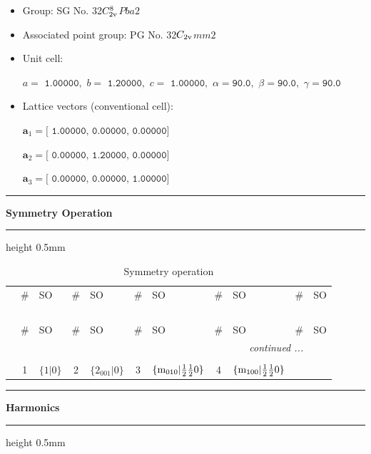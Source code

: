 \documentclass[fleqn,10pt,landscape]{jsarticle}
\begin{document}
\begin{itemize}
\item Group: SG No. 32\quad$C_{\rm 2v}^{8}$\quad$Pba2$\quad[ orthorhombic ]
\item Associated point group: PG No. 32\quad$C_{\rm 2v}$\quad$mm2$\quad[ orthorhombic ]
\end{itemize}
\begin{itemize}
\item Unit cell:

\quad $a=\texttt{ 1.00000},\,\, b=\texttt{ 1.20000},\,\, c=\texttt{ 1.00000},\,\, \alpha=\texttt{90.0},\,\, \beta=\texttt{90.0},\,\, \gamma=\texttt{90.0}$

\item Lattice vectors (conventional cell):

\quad $\bm{a}_1=\texttt{[ 1.00000, 0.00000, 0.00000]}$

\quad $\bm{a}_2=\texttt{[ 0.00000, 1.20000, 0.00000]}$

\quad $\bm{a}_3=\texttt{[ 0.00000, 0.00000, 1.00000]}$

\end{itemize}
\vspace{5mm}
\noindent \rule[0.5mm]{5mm}{0.5mm}\hspace{3mm}\textbf{Symmetry Operation}\hspace{3mm}\leaders\hrule height 0.5mm\hfill\kern0pt
\vspace{3mm}

\renewcommand{\arraystretch}{1.6}
\begin{longtable}[l]{c|cl|cl|cl|cl|cl}
\captionsetup{justification=raggedright, singlelinecheck=off}
\caption{Symmetry operation}
 \\
 \hline \hline
 & \# & SO & \# & SO & \# & SO & \# & SO & \# & SO \\ \hline \endfirsthead

\multicolumn{10}{l}{\tablename\ \thetable{}} \\
 \hline \hline
 & \# & SO & \# & SO & \# & SO & \# & SO & \# & SO \\ \hline \endhead

 \hline \hline
\multicolumn{10}{r}{\footnotesize\it continued ...} \\ \endfoot

 \hline \hline
\multicolumn{10}{r}{} \\ \endlastfoot

 & 1 & $\{1|0\}$ & 2 & $\{2{}_{001}|0\}$ & 3 & $\{{\rm m}_{010}|\frac{1}{2} \frac{1}{2} 0\}$ & 4 & $\{{\rm m}_{100}|\frac{1}{2} \frac{1}{2} 0\}$ \\
\end{longtable}
\vspace{5mm}
\noindent \rule[0.5mm]{5mm}{0.5mm}\hspace{3mm}\textbf{Harmonics}\hspace{3mm}\leaders\hrule height 0.5mm\hfill\kern0pt
\vspace{3mm}
\end{document}
